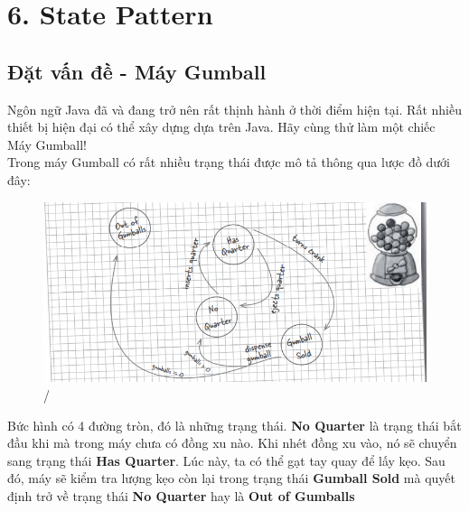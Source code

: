 \chapter{6. State Pattern}
\section{Đặt vấn đề - Máy Gumball}
Ngôn ngữ Java đã và đang trở nên rất thịnh hành ở thời điểm hiện tại. Rất nhiều thiết bị hiện đại có thể xây dựng dựa trên Java. Hãy cùng thử làm một chiếc Máy Gumball!\\[0.1in]
Trong máy Gumball có rất nhiều trạng thái được mô tả thông qua lược đồ dưới đây:

\begin{figure}[!htb]
    \centering
    \includegraphics[width=\textwidth]{fig/State/Gumballs_386.png}/
\end{figure}

Bức hình có 4 đường tròn, đó là những trạng thái. \textbf{No Quarter} là trạng thái bắt đầu khi mà trong máy chưa có đồng xu nào. Khi nhét đồng xu vào, nó sẽ chuyển sang trạng thái \textbf{Has Quarter}. Lúc này, ta có thể gạt tay quay để lấy kẹo. Sau đó, máy sẽ kiểm tra lượng kẹo còn lại trong trạng thái \textbf{Gumball Sold} mà quyết định trở về trạng thái \textbf{No Quarter} hay là \textbf{Out of Gumballs}\\[0.1in]

